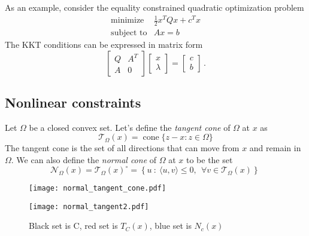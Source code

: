 \documentclass[12pt]{article}
\begin{document}
As an example, consider the equality constrained quadratic optimization problem
\begin{equation*} 
  \begin{array}{ll} 
  \text{minimize} &\frac{1}{2} x^TQx + c^T x\\
  \text{subject to} &Ax = b 
  \end{array}
\end{equation*}
The KKT conditions can be expressed in matrix form
 $$\left[\begin{array}{cc} 
  Q &A^T\\
  A & 0 \end{array} \right]
    \left[\begin{array}{c} 
x\\
\lambda\end{array} \right] =  
\left[\begin{array}{c} 
c\\
b\end{array} \right] \,.$$


\subsection{Nonlinear constraints}

Let $\Omega$ be a closed convex set.  Let's define the \emph{tangent cone} of $\Omega$ at $x$ as 
\[
\mathcal{T}_{\Omega}(x) = \operatorname{cone} \{z - x : z \in \Omega\}
\]
The tangent cone is the set of all directions that can move from $x$ and remain in $\Omega$.  We can also define the \emph{normal cone} of $\Omega$ at $x$ to be the set
\[
	\mathcal{N}_{\Omega}(x) = \mathcal{T}_{\Omega}(x)^\circ = \left\{ u~:~ \langle u,v \rangle \leq 0,~~\forall v\in \mathcal{T}_{\Omega}(x) \right\} \,
\]



\begin{figure}[h!]
    \vspace{-3cm}
    \hspace{-5cm}
    \begin{minipage}{0.45\textwidth}
        \texttt{[image: normal\_tangent\_cone.pdf]} %
    \end{minipage}\hfill
    \begin{minipage}{0.45\textwidth}
        \texttt{[image: normal\_tangent2.pdf]} %
    \end{minipage}
    \hspace{5cm}
    \vspace{-5cm}
    \caption{Black set is C, red set is $T_C(x)$, blue set is $N_c(x)$}
\end{figure}
\end{document}
